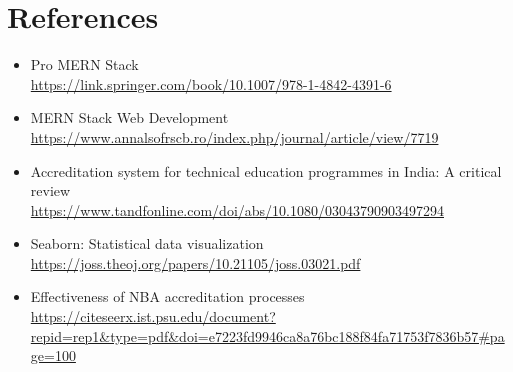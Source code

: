 \documentclass[a4paper,11pt]{report}
\begin{document}
\chapter{References}

\begin{itemize}
\item Pro MERN Stack \\
  \url{https://link.springer.com/book/10.1007/978-1-4842-4391-6}
  

  \item MERN Stack Web Development \\
  \url{https://www.annalsofrscb.ro/index.php/journal/article/view/7719}

  \item Accreditation system for technical education programmes in India: A critical review \\
  \url{https://www.tandfonline.com/doi/abs/10.1080/03043790903497294}
  
  \item Seaborn: Statistical data visualization \\
  \url{https://joss.theoj.org/papers/10.21105/joss.03021.pdf}
\vspace{12pt}

\item Effectiveness of NBA accreditation processes \\
  \url{https://citeseerx.ist.psu.edu/document?repid=rep1&type=pdf&doi=e7223fd9946ca8a76bc188f84fa71753f7836b57#page=100}
\vspace{12pt}
\end{itemize}
\end{document}
